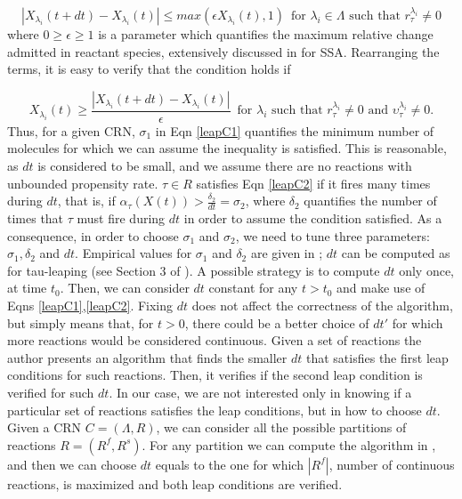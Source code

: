 \documentclass{llncs}
\begin{document}
\[  |X_{\lambda_i}(t+dt)-X_{\lambda_i}(t)|\leq max(\epsilon X_{\lambda_{i}}(t),1)    \,\,\, \text{for $\lambda_i\in \Lambda$ such that $r^{\lambda_i}_{\tau} \neq 0$}       \]
where $0\geq \epsilon \geq 1$ is a parameter which quantifies the maximum relative change admitted in reactant species, extensively discussed in \cite{gillespie2008simulation} for SSA. Rearranging the terms, it is easy to verify that the condition holds if

\[ X_{\lambda_i}(t)\geq \frac{|X_{\lambda_i}(t+dt)-X_{\lambda_i}(t)|}{\epsilon}\,\,\, \text{for $\lambda_i$ such that $r^{\lambda_i}_{\tau} \neq 0$ and $\upsilon^{\lambda_i}_{\tau}\neq 0$.}             \]
Thus, for a given CRN, $\sigma_1$ in Eqn \eqref{leapC1} quantifies the minimum number of molecules for which we can assume the inequality is satisfied. This is reasonable, as $dt$ is considered to be small, and we assume there are no reactions with unbounded propensity rate.
$\tau \in R$ satisfies Eqn \eqref{leapC2} if it fires many times during $dt$, that is, if $\alpha_{\tau}(X(t))>\frac{\delta_2}{dt}=\sigma_2$, where $\delta_2$ quantifies the number of times that $\tau$ must fire during $dt$ in order to assume the condition satisfied. { As a consequence, in order to choose $\sigma_1$ and $\sigma_2$, we need to tune three parameters: $\sigma_1,\delta_2$ and $dt$.} 
Empirical values for $\sigma_1$ and $\delta_2$ are given in \cite{salis2005accurate}; 
$dt$ can be computed as for
tau-leaping (see Section 3 of \cite{gillespie2008simulation}). 
A possible strategy is to compute $dt$  only once, at time $t_0$. Then, we can  consider $dt$ constant for any $t>t_0$ and make use of Eqns \eqref{leapC1},\eqref{leapC2}. Fixing $dt$ does not affect the correctness of the algorithm, but simply means that, for $t>0$, there could be a better choice of $dt'$ for which more reactions would be considered continuous. 
\iffalse
Given a set of reactions the author presents an algorithm that finds the smaller $dt$ that satisfies the first leap conditions for such reactions. Then, it verifies if the second leap condition is verified for such $dt$. In our case, we are not interested only in knowing if a particular set of reactions satisfies the leap conditions, but in how to choose $dt$. Given a CRN $C=(\Lambda,R)$,  we can consider all the possible partitions of reactions $R=(R^f,R^s)$. For any partition we can compute the algorithm in \cite{gillespie2008simulation}, and then we can choose $dt$ equals to the one for which $|R^f|$, number of continuous reactions, is maximized and both leap conditions are verified.
\end{document}
